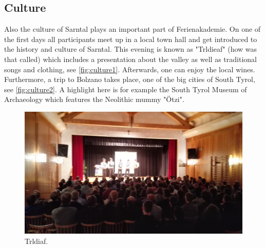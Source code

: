 \subsection{Culture}
Also the culture of Sarntal plays an important part of Ferienakademie. On one of the first days all participants meet up in a local town hall and get introduced to the history and culture of Sarntal. This evening is known as "Trldieaf" (how was that called) which includes a presentation about the valley as well as traditional songs and clothing, see \autoref{fig:culture1}. Afterwards, one can enjoy the local wines. Furthermore, a trip to Bolzano takes place, one of the big cities of South Tyrol, see \autoref{fig:culture2}. A highlight here is for example the South Tyrol Museum of Archaeology which features the Neolithic mummy "Ötzi".
\begin{figure}[ht]%
 	\begin{center}%
 		\includegraphics[scale=0.045]{img/Culture1.jpg}%
 		\caption{Trldiaf.}\label{fig:culture1}%
 	\end{center}%
\end{figure} 
